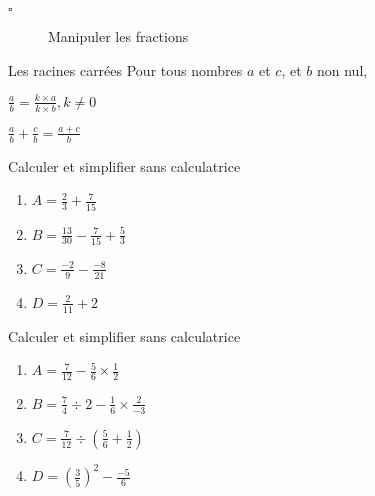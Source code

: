 \begin{titreTice}

\end{titreTice}


\begin{CpsCol}
\begin{description}
\item[$\square$] Manipuler les fractions
\end{description}
\end{CpsCol}


\begin{ThT}{Les racines carrées}
Pour tous nombres $a$ et $c$, et $b$ non nul, 
\begin{description}
\item $\frac{a}{b}=\frac{k \times a}{k \times b} , k \neq 0$
\item $\frac{a}{b} + \frac{c}{b}=\frac{a+c}{b}$
\end{description}
\end{ThT}


\begin{minipage}{0.5\linewidth}


Calculer et simplifier sans calculatrice 

\begin{enumerate}
\item $A = \frac{2}{3} + \frac{7}{15}$
\item $B = \frac{13}{30} - \frac{7}{15} + \frac{5}{3}$
\item $C = \frac{-2}{9} - \frac{-8}{21}$
\item $D = \frac{2}{11} + 2$
\end{enumerate}

\end{minipage}
\begin{minipage}{0.5\linewidth}


Calculer et simplifier sans calculatrice

\begin{enumerate}
\item $A = \frac{7}{12} - \frac{5}{6} \times \frac{1}{2}$
\item $B = \frac{7}{4} \div 2 - \frac{1}{6} \times \frac{2}{-3}$
\item $C = \frac{7}{12} \div \left( \frac{5}{6} + \frac{1}{2} \right) $
\item $D = \left( \frac{3}{5}\right)^2 -\frac{-5}{6} $
\end{enumerate}

\end{minipage}

